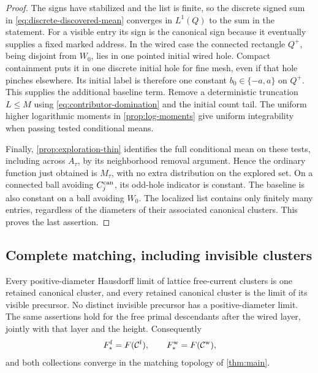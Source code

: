\begin{proof}
The signs have stabilized and the list is finite, so the discrete
signed sum in \cref{eq:discrete-discovered-mean} converges in
\(L^1(Q)\) to the sum in the statement. For a visible entry its sign
is the canonical sign because it eventually supplies a fixed marked
address. In the wired case the connected
rectangle \(Q^+\), being disjoint from \(W_0\), lies in one pointed
initial wired hole. Compact containment puts it in one discrete
initial hole for fine mesh, even if that hole pinches elsewhere.
Its initial label is therefore one constant \(b_0\in\{-a,a\}\)
on \(Q^+\). This supplies the additional baseline term.
Remove a deterministic truncation \(L\leq M\) using
\cref{eq:contributor-domination} and the initial count tail.
The uniform higher logarithmic moments in \cref{prop:log-moments}
give uniform integrability when passing tested conditional means.

Finally, \cref{prop:exploration-thin} identifies the full conditional
mean on these tests, including across \(A_\tau\), by its neighborhood
removal argument. Hence the ordinary function just obtained is
\(M_\tau\), with no extra distribution on the explored set.
On a connected ball avoiding \(C_j^{\rm can}\), its odd-hole indicator
is constant. The baseline is also constant on a ball avoiding \(W_0\).
The localized list contains only finitely many entries, regardless
of the diameters of their associated canonical clusters. This proves
the last assertion.
\end{proof}

\subsection{Complete matching, including invisible clusters}

\begin{proposition}
\label{prop:complete-matching}
Every positive-diameter Hausdorff limit of lattice free-current clusters
is one retained canonical cluster, and every retained canonical cluster
is the limit of its visible precursor. No distinct invisible precursor
has a positive-diameter limit. The same assertions hold for the free
primal descendants after the wired layer, jointly with that layer and
the height. Consequently
\[
 F_*^{\mathrm f}=F(\mathcal C^{\rm f}),\qquad
 F_*^{\mathrm w}=F(\mathcal C^{\rm w}),
\]
and both collections converge in the matching topology of
\cref{thm:main}.
\end{proposition}

